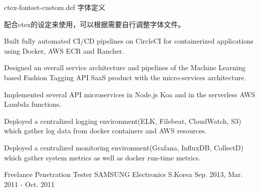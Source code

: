 \begin{cventries}

  \cventry
    {ctex-fontset-custom.def}
    {字体定义}
    {}
    {}
    {
      \begin{cvitems} %
        \item {配合ctex的设定来使用，可以根据需要自行调整字体文件。}
        \item {Built fully automated CI/CD pipelines on CircleCI for containerized applications using Docker, AWS ECR and Rancher.}
        \item {Designed an overall service architecture and pipelines of the Machine Learning based Fashion Tagging API SaaS product with the micro-services architecture.}
        \item {Implemented several API microservices in Node.js Koa and in the serverless AWS Lambda functions.}
        \item {Deployed a centralized logging environment(ELK, Filebeat, CloudWatch, S3) which gather log data from docker containers and AWS resources.}
        \item {Deployed a centralized monitoring environment(Grafana, InfluxDB, CollectD) which gather system metrics as well as docker run-time metrics.}
      \end{cvitems}
    }

  \cventry
    {Freelance Penetration Tester} %
    {SAMSUNG Electronics} %
    {S.Korea} %
    {Sep. 2013, Mar. 2011 - Oct. 2011} %
    {
      \begin{cvsubentries}
      \end{cvsubentries}
    }

\end{cventries}

